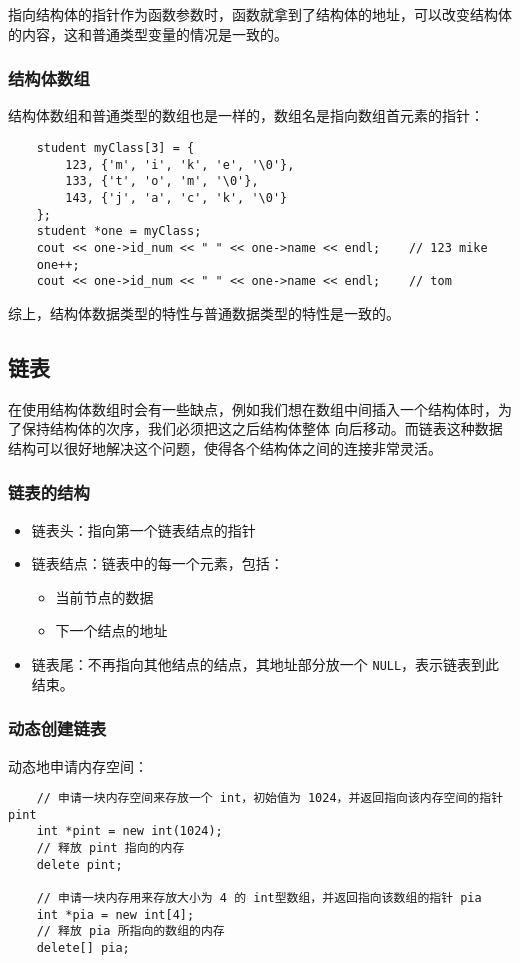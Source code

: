 \documentclass[UTF8]{ctexart}
\begin{document}
指向结构体的指针作为函数参数时，函数就拿到了结构体的地址，可以改变结构体的内容，这和普通类型变量的情况是一致的。

\subsubsection{结构体数组}
结构体数组和普通类型的数组也是一样的，数组名是指向数组首元素的指针：
\begin{verbatim}
    student myClass[3] = {
        123, {'m', 'i', 'k', 'e', '\0'},
        133, {'t', 'o', 'm', '\0'},
        143, {'j', 'a', 'c', 'k', '\0'}
    };
    student *one = myClass;
    cout << one->id_num << " " << one->name << endl;    // 123 mike
    one++;
    cout << one->id_num << " " << one->name << endl;    // tom
\end{verbatim}

综上，结构体数据类型的特性与普通数据类型的特性是一致的。

\subsection{链表}
在使用结构体数组时会有一些缺点，例如我们想在数组中间插入一个结构体时，为了保持结构体的次序，我们必须把这之后结构体整体
向后移动。而链表这种数据结构可以很好地解决这个问题，使得各个结构体之间的连接非常灵活。

\subsubsection{链表的结构}
\begin{itemize}
    \item 链表头：指向第一个链表结点的指针
    \item 链表结点：链表中的每一个元素，包括：
    \begin{itemize}
        \item 当前节点的数据
        \item 下一个结点的地址
    \end{itemize}
    \item 链表尾：不再指向其他结点的结点，其地址部分放一个 \texttt{NULL}，表示链表到此结束。
\end{itemize}

\subsubsection{动态创建链表}
动态地申请内存空间：
\begin{verbatim}
    // 申请一块内存空间来存放一个 int，初始值为 1024，并返回指向该内存空间的指针 pint
    int *pint = new int(1024);
    // 释放 pint 指向的内存
    delete pint;

    // 申请一块内存用来存放大小为 4 的 int型数组，并返回指向该数组的指针 pia
    int *pia = new int[4];
    // 释放 pia 所指向的数组的内存
    delete[] pia;
\end{verbatim}
\end{document}
